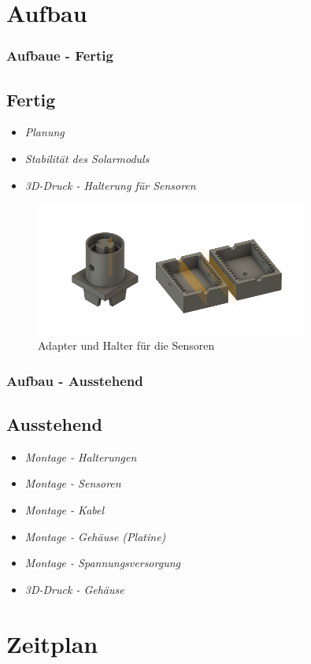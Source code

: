 \documentclass{beamer}
\begin{document}
\section{Aufbau}
\begin{frame}
  \frametitle{Aufbaue - Fertig}
  \subsection{Fertig}
  \begin{itemize}
  \item \emph{Planung}
  \item \emph{Stabilität des Solarmoduls}
  \item \emph{3D-Druck - Halterung für Sensoren}
  \end{itemize}
  \begin{figure}[hbtp]
    \centering \includegraphics[width=0.8\textwidth]{./img/druck.png}
    \caption{Adapter und Halter für die Sensoren}
  \end{figure}
\end{frame}

\begin{frame}
  \frametitle{Aufbau - Ausstehend}
  \subsection{Ausstehend}
  \begin{itemize}
  \item \emph{Montage - Halterungen}
  \item \emph{Montage - Sensoren}
  \item \emph{Montage - Kabel}
  \item \emph{Montage - Gehäuse (Platine)}
  \item \emph{Montage - Spannungsversorgung}
  \item \emph{3D-Druck - Gehäuse}
  \end{itemize}
\end{frame}

\section{Zeitplan}
\end{document}
